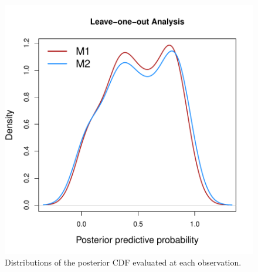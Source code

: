 \documentclass{asaproc}
\begin{document}
\begin{figure}[ht]
\centering
\includegraphics[scale=0.50]{figs/loo.pdf}
\caption{Distributions of the posterior CDF evaluated at each observation.}
\label{loo}
\end{figure}
\end{document}
